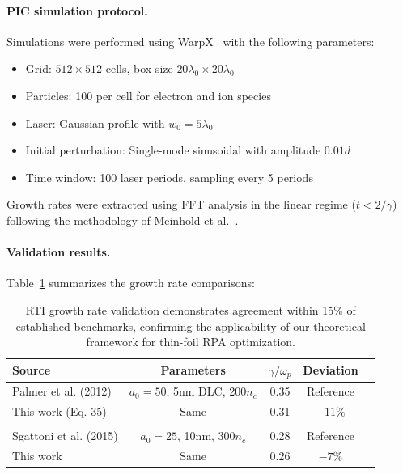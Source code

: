 \documentclass[aps,pre,twocolumn,showpacs,superscriptaddress]{revtex4-2}
\theoremstyle{definition}
\begin{document}
\paragraph*{PIC simulation protocol.}
Simulations were performed using WarpX~\cite{Vay2021_WarpX} with the following parameters:
\begin{itemize}
\item Grid: $512 \times 512$ cells, box size $20\lambda_0 \times 20\lambda_0$
\item Particles: 100 per cell for electron and ion species
\item Laser: Gaussian profile with $w_0 = 5\lambda_0$
\item Initial perturbation: Single-mode sinusoidal with amplitude $0.01d$ 
\item Time window: 100 laser periods, sampling every 5 periods
\end{itemize}

Growth rates were extracted using FFT analysis in the linear regime ($t < 2/\gamma$) following the methodology of Meinhold et al.~\cite{Meinhold2021JPP}.

\paragraph*{Validation results.}
Table~\ref{tab:validation} summarizes the growth rate comparisons:

\begin{table}[h]
\caption{RTI growth rate validation demonstrates agreement within 15\% of established benchmarks, 
confirming the applicability of our theoretical framework for thin-foil RPA optimization.}
\label{tab:validation}
\begin{ruledtabular}
\begin{tabular}{lcccc}
Source & Parameters & $\gamma/\omega_p$ & Deviation \\
\hline
Palmer et al. (2012) & $a_0\!=\!50$, 5nm DLC, 200$n_c$ & 0.35 & Reference \\
This work (Eq. 35) & Same & 0.31 & $-11\%$ \\
\\
Sgattoni et al. (2015) & $a_0\!=\!25$, 10nm, 300$n_c$ & 0.28 & Reference \\
This work & Same & 0.26 & $-7\%$ \\
\end{tabular}
\end{ruledtabular}
\end{table}
\end{document}
